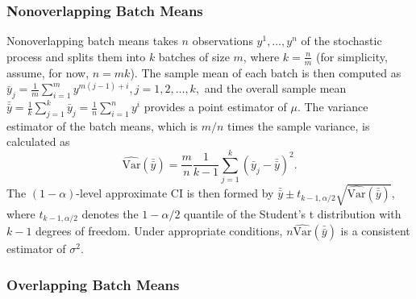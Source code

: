 \documentclass[12pt]{article}
\newcommand{\varhat}{\widehat{\mathrm{Var}}}
\newcommand{\yb}{\bar{y}}
\newcommand{\ybb}{\bar{\yb}}
\begin{document}
\subsubsection{Nonoverlapping Batch Means}

Nonoverlapping batch means takes $n$ observations $y^1, \dots, y^n$ of the stochastic process and splits them into $k$ batches of size $m$, where $k = \frac{n}{m}$ (for simplicity, assume, for now, $n = mk$).  
The sample mean of each batch is then computed as
$
	\yb_j = \frac{1}{m} \sum_{i=1}^{m} y^{m(j-1)+i}, j = 1,2, \dots, k,
$
and the overall sample mean $\ybb = \frac{1}{k} \sum_{j=1}^k \yb_j = \frac{1}{n} \sum_{i=1}^n y^i$ provides a point estimator of $\mu$.  
The variance estimator of the batch means, which is $m/n$ times the sample variance, is calculated as
\begin{equation} \label{eq:var}
	\varhat(\ybb) = \frac{m}{n}\frac{1}{k-1} \sum_{j=1}^k \left( \yb_j - \ybb \right)^2.
\end{equation}
The $(1-\alpha)$-level approximate CI is then formed by $\ybb \pm t_{k-1,\alpha/2} \sqrt{\varhat(\ybb)}$, where $t_{k-1,\alpha/2}$ denotes the $1-\alpha/2$ quantile of the Student's t distribution with $k-1$ degrees of freedom.  
Under appropriate conditions, $n\varhat(\ybb)$ is a consistent estimator of $\sigma^2$.

\subsubsection{Overlapping Batch Means}
\label{ssec:overlap}
\end{document}
